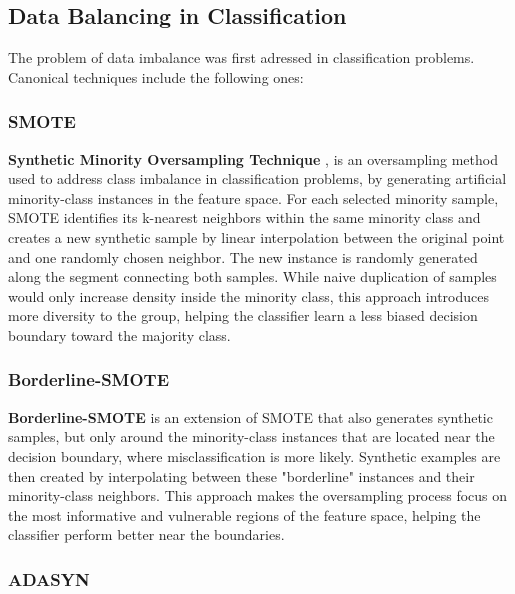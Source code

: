\subsection{Data Balancing in Classification}
\label{subsec:soa_data_balancing_classification}

The problem of data imbalance was first adressed in classification problems. Canonical techniques include the following ones:

\subsubsection{SMOTE}
\label{subsubsec:soa_smote}

\textbf{Synthetic Minority Oversampling Technique} \cite{chawla2002smote}, is an oversampling method used to address class imbalance in classification problems, by generating artificial minority-class instances in the feature space. For each selected minority sample, SMOTE identifies its k-nearest neighbors within the same minority class and creates a new synthetic sample by linear interpolation between the original point and one randomly chosen neighbor. The new instance is randomly generated along the segment connecting both samples. While naive duplication of samples would only increase density inside the minority class, this approach introduces more diversity to the group, helping the classifier learn a less biased decision boundary toward the majority class.

\subsubsection{Borderline-SMOTE}
\label{subsubsec:soa_borderline_smote}

\textbf{Borderline-SMOTE} \cite{10.1007/11538059_91} is an extension of SMOTE that also generates synthetic samples, but only around the minority-class instances that are located near the decision boundary, where misclassification is more likely. Synthetic examples are then created by interpolating between these "borderline" instances and their minority-class neighbors. This approach makes the oversampling process focus on the most informative and vulnerable regions of the feature space, helping the classifier perform better near the boundaries.

\subsubsection{ADASYN}
\label{subsubsec:soa_adasyn}


